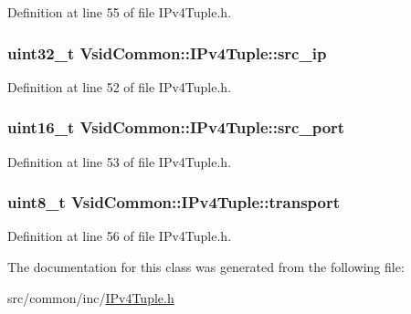 Definition at line 55 of file I\-Pv4\-Tuple.\-h.

\hypertarget{class_vsid_common_1_1_i_pv4_tuple_a2db76e768086b4ac0aabfed850940c76}{
\subsubsection[{src\-\_\-ip}]{\setlength{\rightskip}{0pt plus 5cm}uint32\-\_\-t Vsid\-Common\-::\-I\-Pv4\-Tuple\-::src\-\_\-ip}}\label{class_vsid_common_1_1_i_pv4_tuple_a2db76e768086b4ac0aabfed850940c76}


Definition at line 52 of file I\-Pv4\-Tuple.\-h.

\hypertarget{class_vsid_common_1_1_i_pv4_tuple_a68b8ec74e1abb0d15ba66c48837a1662}{
\subsubsection[{src\-\_\-port}]{\setlength{\rightskip}{0pt plus 5cm}uint16\-\_\-t Vsid\-Common\-::\-I\-Pv4\-Tuple\-::src\-\_\-port}}\label{class_vsid_common_1_1_i_pv4_tuple_a68b8ec74e1abb0d15ba66c48837a1662}


Definition at line 53 of file I\-Pv4\-Tuple.\-h.

\hypertarget{class_vsid_common_1_1_i_pv4_tuple_a39c4c8ec9aaa3f80d17daaefb783beec}{
\subsubsection[{transport}]{\setlength{\rightskip}{0pt plus 5cm}uint8\-\_\-t Vsid\-Common\-::\-I\-Pv4\-Tuple\-::transport}}\label{class_vsid_common_1_1_i_pv4_tuple_a39c4c8ec9aaa3f80d17daaefb783beec}


Definition at line 56 of file I\-Pv4\-Tuple.\-h.



The documentation for this class was generated from the following file\-:\begin{DoxyCompactItemize}
\item 
src/common/inc/\hyperlink{_i_pv4_tuple_8h}{I\-Pv4\-Tuple.\-h}\end{DoxyCompactItemize}
